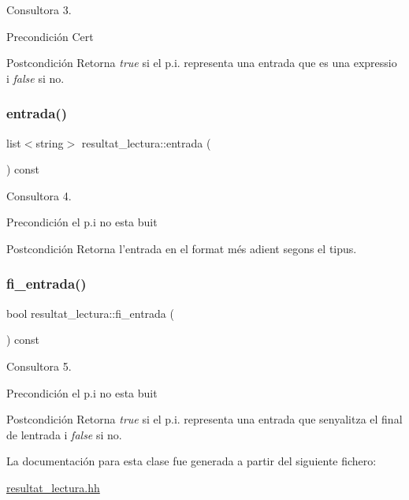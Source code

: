 Consultora 3. 

\begin{DoxyPrecond}{Precondición}
Cert 
\end{DoxyPrecond}
\begin{DoxyPostcond}{Postcondición}
Retorna {\itshape true} si el p.\+i. representa una entrada que es una expressio i {\itshape false} si no. 
\end{DoxyPostcond}
\hypertarget{classresultat__lectura_a2b6b1c0d200ea75619f7ad50600551c6}{}\label{classresultat__lectura_a2b6b1c0d200ea75619f7ad50600551c6} 
\subsubsection{\texorpdfstring{entrada()}{entrada()}}
{\footnotesize\ttfamily list$<$string$>$ resultat\+\_\+lectura\+::entrada (\begin{DoxyParamCaption}{ }\end{DoxyParamCaption}) const}



Consultora 4. 

\begin{DoxyPrecond}{Precondición}
el p.\+i no esta buit 
\end{DoxyPrecond}
\begin{DoxyPostcond}{Postcondición}
Retorna l’entrada en el format més adient segons el tipus. 
\end{DoxyPostcond}
\hypertarget{classresultat__lectura_a178d0aae65fbce754ec5d99a04732bf0}{}\label{classresultat__lectura_a178d0aae65fbce754ec5d99a04732bf0} 
\subsubsection{\texorpdfstring{fi\+\_\+entrada()}{fi\_entrada()}}
{\footnotesize\ttfamily bool resultat\+\_\+lectura\+::fi\+\_\+entrada (\begin{DoxyParamCaption}{ }\end{DoxyParamCaption}) const}



Consultora 5. 

\begin{DoxyPrecond}{Precondición}
el p.\+i no esta buit 
\end{DoxyPrecond}
\begin{DoxyPostcond}{Postcondición}
Retorna {\itshape true} si el p.\+i. representa una entrada que senyalitza el final de l\textquotesingle{}entrada i {\itshape false} si no. 
\end{DoxyPostcond}


La documentación para esta clase fue generada a partir del siguiente fichero\+:\begin{DoxyCompactItemize}
\item 
\hyperlink{resultat__lectura_8hh}{resultat\+\_\+lectura.\+hh}\end{DoxyCompactItemize}
